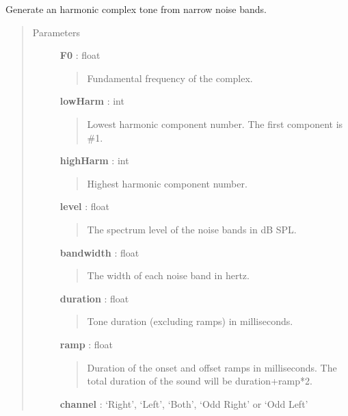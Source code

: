 \documentclass[a4paper,12pt,english]{sphinxmanual}
\begin{document}
\begin{fulllineitems}
\label{sndlib:sndlib.harmComplFromNarrowbandNoise}
Generate an harmonic complex tone from narrow noise bands.
\begin{quote}\begin{description}
\item[{Parameters }] \leavevmode
\textbf{F0} : float
\begin{quote}

Fundamental frequency of the complex.
\end{quote}

\textbf{lowHarm} : int
\begin{quote}

Lowest harmonic component number. The first component is \#1.
\end{quote}

\textbf{highHarm} : int
\begin{quote}

Highest harmonic component number.
\end{quote}

\textbf{level} : float
\begin{quote}

The spectrum level of the noise bands in dB SPL.
\end{quote}

\textbf{bandwidth} : float
\begin{quote}

The width of each noise band in hertz.
\end{quote}

\textbf{duration} : float
\begin{quote}

Tone duration (excluding ramps) in milliseconds.
\end{quote}

\textbf{ramp} : float
\begin{quote}

Duration of the onset and offset ramps in milliseconds.
The total duration of the sound will be duration+ramp*2.
\end{quote}

\textbf{channel} : `Right', `Left', `Both', `Odd Right' or `Odd Left'
\begin{quote}


\end{quote}
\end{description}
\end{quote}
\end{fulllineitems}
\end{document}
